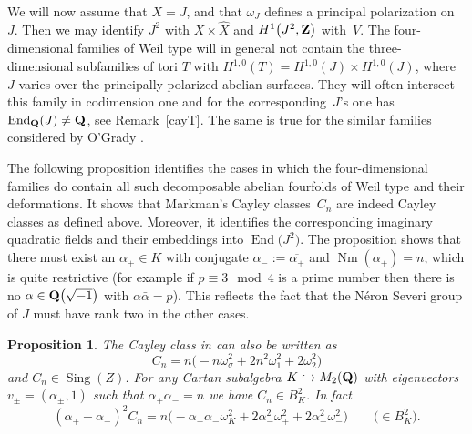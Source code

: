 \documentclass[10pt,a4paper]{amsart}
\numberwithin{equation}{section}
\newtheorem{Proposition}[Theorem]{Proposition}
 { \theoremstyle{definition}
\newtheorem{Definition}[Theorem]{Definition}
\newtheorem{Note}[Theorem]{Note}
\newtheorem{Example}[Theorem]{Example}
\newtheorem{Remark}[Theorem]{Remark} }
\begin{document}
We will now assume that $X=J$, and that $\omega_J$ defines a principal polarization on~$J$.
Then we may identify $J^2$ with $X\times\widehat{X}$ and $H^1\big(J^2,{\bf Z}\big)$ with~$V$.
The four-dimensional families of Weil type will in general not
contain the three-dimensional subfamilies of
tori $T$ with $H^{1,0}(T)=H^{1,0}(J)\times H^{1,0}(J)$, where $J$ varies over the principally
polarized abelian surfaces.
They will often intersect this family in codimension one
and for the corresponding~$J$'s one has $\operatorname{End}_{\bf Q}(J)\neq {\bf Q}$, see Remark~\ref{cayT}.
The same is true for the similar families considered by O'Grady \cite[Theorem~5.1]{O'G}.

The following proposition identifies the cases in which the four-dimensional families
do contain all such decomposable abelian fourfolds of Weil type and their deformations.
It shows that Markman's Cayley classes~$C_n$ are indeed Cayley classes
as defined above. Moreover, it identifies
the corresponding imaginary quadratic fields and their embeddings into $\operatorname{End}\big(J^2\big)$.
The proposition shows that there must exist an
$\alpha_+\in K$ with conjugate $\alpha_-:=\overline{\alpha_+}$ and $\operatorname{Nm}(\alpha_+)=n$,
which is quite restrictive (for example if $p\equiv 3 \mod 4$ is a prime number then
there is no $\alpha\in {\bf Q}\big(\sqrt{-1}\big)$ with $\alpha\bar{\alpha}=p$).
This reflects the fact that the N\'eron Severi group of $J$ must have
rank two in the other cases.

\begin{Proposition} \label{propmarkman}
The Cayley class in {\rm \cite[Proposition~11.2]{Markman}} can also be written as
\[
C_n = n\big({-}n\omega_\sigma^2 + 2n^2\omega_1^2 + 2\omega_2^2\big)
\]
and $C_n\in \operatorname{Sing}(Z)$.
For any Cartan subalgebra $K\hookrightarrow M_2({\bf Q})$
with eigenvectors $v_\pm=(\alpha_\pm,1)$ such that
$\alpha_+\alpha_-=n$ we have $C_n\in B^2_K$. In fact
\[
(\alpha_+ - \alpha_-)^2C_{n} = n\big({-}\alpha_+\alpha_-\omega_K^2
 + 2\alpha_-^2\omega_+^2+2\alpha_+^2\omega_-^2\big)\qquad\big(\!\!\in B^2_K\big).
\]
\end{Proposition}
\end{document}
